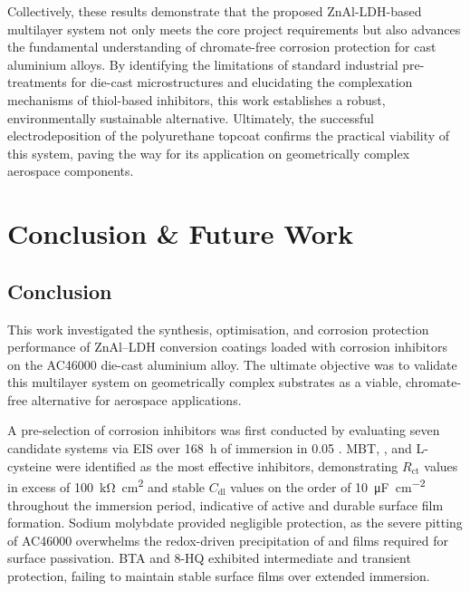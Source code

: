 \documentclass[11pt,twoside,a4paper,final]{report}
\begin{document}
Collectively, these results demonstrate that the proposed ZnAl-LDH-based multilayer system not only meets the core project requirements but also advances the fundamental understanding of chromate-free corrosion protection for cast aluminium alloys. By identifying the limitations of standard industrial pre-treatments for die-cast microstructures and elucidating the complexation mechanisms of thiol-based inhibitors, this work establishes a robust, environmentally sustainable alternative. Ultimately, the successful electrodeposition of the polyurethane topcoat confirms the practical viability of this system, paving the way for its application on geometrically complex aerospace components.


\chapter{Conclusion \& Future Work}
\section{Conclusion}

This work investigated the synthesis, optimisation, and corrosion protection performance of ZnAl--LDH conversion coatings loaded with corrosion inhibitors on the AC46000 die-cast aluminium alloy. The ultimate objective was to validate this multilayer system on geometrically complex substrates as a viable, chromate-free alternative for aerospace applications.

A pre-selection of corrosion inhibitors was first conducted by evaluating seven candidate systems via EIS over \qty{168}{\hour} of immersion in \qty{0.05}{\molar} . MBT, , and L-cysteine were identified as the most effective inhibitors, demonstrating $R_{\text{ct}}$ values in excess of \qty{100}{\kilo\ohm\centi\meter\squared} and stable $C_{\text{dl}}$ values on the order of \qty{10}{\micro\farad\per\centi\meter\squared} throughout the immersion period, indicative of active and durable surface film formation. Sodium molybdate provided negligible protection, as the severe pitting of AC46000 overwhelms the redox-driven precipitation of  and  films required for surface passivation. BTA and 8-HQ exhibited intermediate and transient protection, failing to maintain stable surface films over extended immersion.
\end{document}
